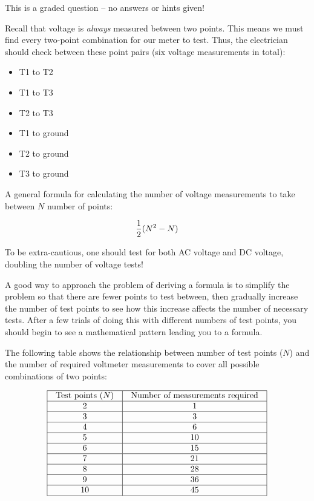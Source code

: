 
This is a graded question -- no answers or hints given!







Recall that voltage is {\it always} measured between two points.  This means we must find every two-point combination for our meter to test.  Thus, the electrician should check between these point pairs (six voltage measurements in total):

\begin{itemize}
\item{} T1 to T2
\item{} T1 to T3
\item{} T2 to T3
\item{} T1 to ground
\item{} T2 to ground
\item{} T3 to ground
\end{itemize}

A general formula for calculating the number of voltage measurements to take between $N$ number of points:

$${1 \over 2}(N^2 - N)$$

\vskip 10pt

To be extra-cautious, one should test for both AC voltage and DC voltage, doubling the number of voltage tests!

\vskip 10pt

A good way to approach the problem of deriving a formula is to simplify the problem so that there are fewer points to test between, then gradually increase the number of test points to see how this increase affects the number of necessary tests.  After a few trials of doing this with different numbers of test points, you should begin to see a mathematical pattern leading you to a formula.

The following table shows the relationship between number of test points ($N$) and the number of required voltmeter measurements to cover all possible combinations of two points:


$$\vbox{\offinterlineskip
\halign{\strut
\vrule \quad\hfil # \ \hfil & 
\vrule \quad\hfil # \ \hfil \vrule \cr
\noalign{\hrule}
%
Test points ($N$) & Number of measurements required \cr
%
\noalign{\hrule}
%
2 & 1 \cr
%
\noalign{\hrule}
%
3 & 3 \cr
%
\noalign{\hrule}
%
4 & 6 \cr
%
\noalign{\hrule}
%
5 & 10 \cr
%
\noalign{\hrule}
%
6 & 15 \cr
%
\noalign{\hrule}
%
7 & 21 \cr
%
\noalign{\hrule}
%
8 & 28 \cr
%
\noalign{\hrule}
%
9 & 36 \cr
%
\noalign{\hrule}
%
10 & 45 \cr
%
\noalign{\hrule}
} %
}$$ %

